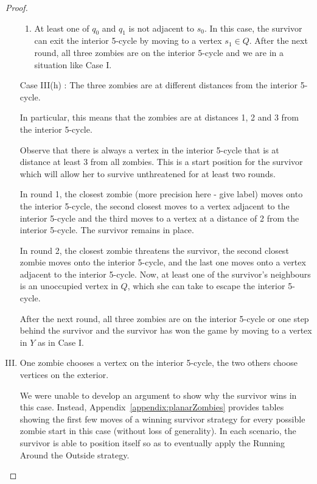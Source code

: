 \begin{proof}
\begin{enumerate}[I.]
\begin{enumerate}
\item At least one of $q_0$ and $q_1$ is not adjacent to $s_0$. In this case, the survivor can exit the interior 5-cycle by moving to a vertex $s_1 \in Q$. After the next
round, all three zombies are on the interior 5-cycle and we are in a situation like Case I.
\end{enumerate}

\item[Case III(h)]: The three zombies are at different distances from the interior 5-cycle.

In particular, this means that the zombies are at distances 1, 2 and 3 from the interior 5-cycle.

Observe that there is always a vertex in the interior 5-cycle that is at distance at least 3 from all zombies. This is a start position for the survivor which
will allow her to survive unthreatened for at least two rounds.

In round 1, the closest zombie (more precision here - give label) moves onto the interior 5-cycle, the second closest moves to a vertex adjacent to the interior 5-cycle and the third
moves to a vertex at a distance of 2 from the interior 5-cycle. The survivor remains in place.

In round 2, the closest zombie threatens the survivor, the second closest zombie moves onto the interior 5-cycle, and the last one moves onto a vertex adjacent to the
interior 5-cycle. Now, at least one of the survivor's neighbours is an unoccupied vertex in $Q$, which she can take to escape the interior 5-cycle.

After the next round, all three zombies are on the interior 5-cycle or one step behind the survivor and the survivor has won the game by moving to a vertex in $Y$
as in Case I.

\item One zombie chooses a vertex on the interior 5-cycle, the two others choose vertices on the exterior.\label{planar case 4}

We were unable to develop an argument to show why the survivor wins in this case.
Instead, Appendix~\ref{appendix:planarZombies} provides tables showing the first few moves of a winning survivor strategy
for every possible zombie start in this case (without loss of generality). In each scenario, the survivor is able to position itself so as to eventually apply the Running Around the Outside strategy.


\end{enumerate}
\end{proof}
